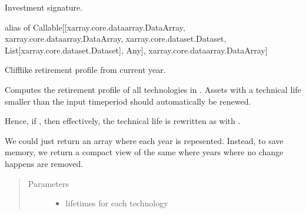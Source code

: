 \documentclass[letterpaper,10pt,english]{sphinxmanual}
\begin{document}
\begin{fulllineitems}
\label{\detokenize{api:muse.investments.INVESTMENT_SIGNATURE}}
Investment signature.

alias of Callable{[}{[}xarray.core.dataarray.DataArray, xarray.core.dataarray.DataArray, xarray.core.dataset.Dataset, List{[}xarray.core.dataset.Dataset{]}, Any{]}, xarray.core.dataarray.DataArray{]}

\end{fulllineitems}


\begin{fulllineitems}
\label{\detokenize{api:muse.investments.cliff_retirement_profile}}
Cliff\sphinxhyphen{}like retirement profile from current year.

Computes the retirement profile of all technologies in .
Assets with a technical life smaller than the input time\sphinxhyphen{}period should automatically
be renewed.

Hence, if , then effectively, the technical life is
rewritten as  with .

We could just return an array where each year is repesented. Instead, to save
memory, we return a compact view of the same where years where no change happens are
removed.
\begin{quote}\begin{description}
\item[{Parameters}] \leavevmode\begin{itemize}
\item {} 
 \textendash{} lifetimes for each technology


\end{itemize}
\end{description}
\end{quote}
\end{fulllineitems}
\end{document}
